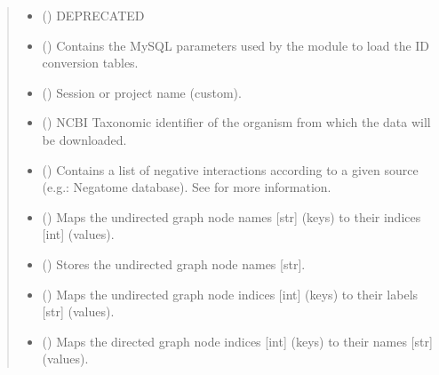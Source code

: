 \documentclass[letterpaper,10pt,english]{sphinxmanual}
\begin{document}
\begin{fulllineitems}
\begin{quote}
\begin{description}
\begin{itemize}
\item {} 
 () \textendash{} DEPRECATED

\item {} 
 () \textendash{} Contains the MySQL parameters used by the
 module to load the ID conversion
tables.

\item {} 
 () \textendash{} Session or project name (custom).

\item {} 
 () \textendash{} NCBI Taxonomic identifier of the organism from which the data
will be downloaded.

\item {} 
 () \textendash{} Contains a list of negative interactions according to a given
source (e.g.: Negatome database). See
{\hyperref[\detokenize{reference:pypath.main.PyPath.apply_negative}]{}} for more
information.

\item {} 
 () \textendash{} Maps the undirected graph node names {[}str{]} (keys) to their
indices {[}int{]} (values).

\item {} 
 () \textendash{} Stores the undirected graph node names {[}str{]}.

\item {} 
 () \textendash{} Maps the undirected graph node indices {[}int{]} (keys) to their
labels {[}str{]} (values).

\item {} 
 () \textendash{} Maps the directed graph node indices {[}int{]} (keys) to their names
{[}str{]} (values).


\end{itemize}
\end{description}
\end{quote}
\end{fulllineitems}
\end{document}
